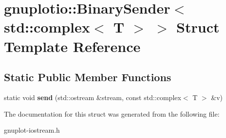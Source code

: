 \hypertarget{structgnuplotio_1_1BinarySender_3_01std_1_1complex_3_01T_01_4_01_4}{}\section{gnuplotio\+:\+:Binary\+Sender$<$ std\+:\+:complex$<$ T $>$ $>$ Struct Template Reference}
\label{structgnuplotio_1_1BinarySender_3_01std_1_1complex_3_01T_01_4_01_4}
\subsection*{Static Public Member Functions}
\begin{DoxyCompactItemize}
\item 
\mbox{\label{structgnuplotio_1_1BinarySender_3_01std_1_1complex_3_01T_01_4_01_4_a759de700a1cd68000830a4b15a6fec49}} 
static void {\bfseries send} (std\+::ostream \&stream, const std\+::complex$<$ T $>$ \&v)
\end{DoxyCompactItemize}


The documentation for this struct was generated from the following file\+:\begin{DoxyCompactItemize}
\item 
gnuplot-\/iostream.\+h\end{DoxyCompactItemize}
